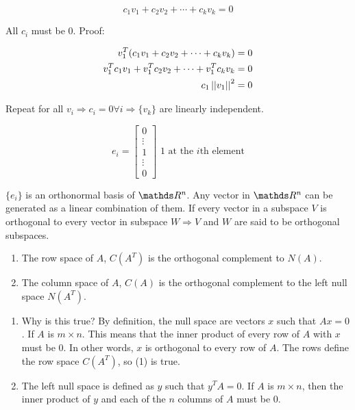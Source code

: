 \[
  c_1v_1 + c_2v_2 + \cdots + c_kv_k=0
\]

All $c_i$ must be 0. Proof:

\begin{align*}
  v_1^T(c_1v_1 + c_2v_2 + \cdots + c_kv_k)&=0 \\
  v_1^Tc_1v_1 + v_1^Tc_2v_2 + \cdots + v_1^Tc_kv_k &=0 \\
  c_1 \left|\left|v_1\right|\right|^2 &= 0
\end{align*}

Repeat for all $v_i \Rightarrow c_i = 0 \forall i \Rightarrow \{v_k\}$ are linearly independent.

\[
  e_i = \begin{bmatrix}
    0 \\ \vdots \\ 1 \\ \vdots \\ 0
  \end{bmatrix} \text{ 1 at the } i\text{th element}
\]

$\{e_i\}$ is an orthonormal basis of $\bbR^n$. Any vector in $\bbR^n$ can be generated as a linear combination of them. If every vector in a subspace $V$ is orthogonal to every vector in subspace $W \Rightarrow V$ and $W$ are said to be orthogonal subspaces.

\begin{enumerate}
  \item The row space of $A$, $C(A^T)$ is the orthogonal complement to $N(A)$.
  \item The column space of $A$, $C(A)$ is the orthogonal complement to the left null space $N(A^T)$.
\end{enumerate}

\begin{enumerate}
  \item Why is this true? By definition, the null space are vectors $x$ such that $Ax = 0$. If $A$ is $m \times n$. This means that the inner product of every row of $A$ with $x$ must be 0. In other words, $x$ is orthogonal to every row of $A$. The rows define the row space $C(A^T)$, so (1) is true.
  \item The left null space is defined as $y$ such that $y^TA = 0$. If $A$ is $m \times n$, then the inner product of $y$ and each of the $n$ columns of $A$ must be 0.
\end{enumerate}
